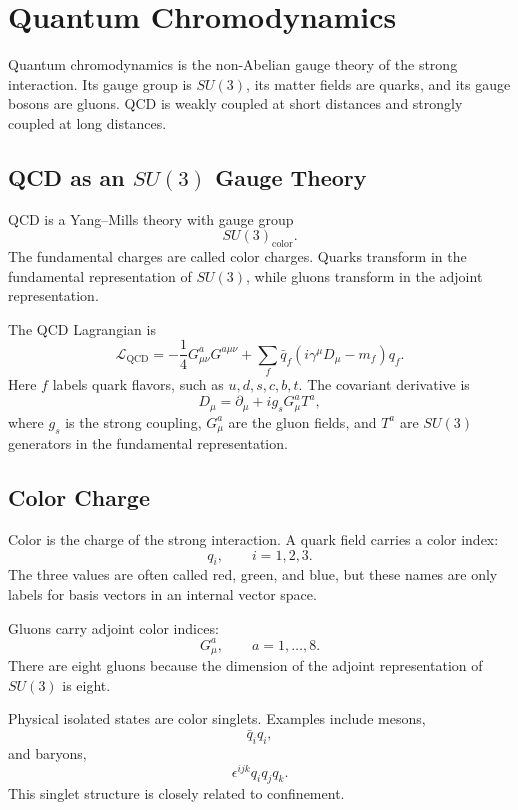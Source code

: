 \chapter{Quantum Chromodynamics}

\begin{remarkbox}
Quantum chromodynamics is the non-Abelian gauge theory of the strong
interaction. Its gauge group is \(SU(3)\), its matter fields are quarks, and its
gauge bosons are gluons. QCD is weakly coupled at short distances and strongly
coupled at long distances.
\end{remarkbox}

\section{QCD as an \texorpdfstring{\(SU(3)\)}{SU(3)} Gauge Theory}

QCD is a Yang--Mills theory with gauge group
\[
    SU(3)_{\mathrm{color}}.
\]
The fundamental charges are called color charges. Quarks transform in the
fundamental representation of \(SU(3)\), while gluons transform in the adjoint
representation.

The QCD Lagrangian is
\[
    \mathcal{L}_{\mathrm{QCD}}
    = -\frac{1}{4}G_{\mu\nu}^aG^{a\mu\nu}
      +\sum_f \bar q_f(i\gamma^\mu D_\mu-m_f)q_f.
\]
Here \(f\) labels quark flavors, such as \(u,d,s,c,b,t\). The covariant
derivative is
\[
    D_\mu=\partial_\mu+ig_s G_\mu^a T^a,
\]
where \(g_s\) is the strong coupling, \(G_\mu^a\) are the gluon fields, and
\(T^a\) are \(SU(3)\) generators in the fundamental representation.

\section{Color Charge}

Color is the charge of the strong interaction. A quark field carries a color
index:
\[
    q_i,
    \qquad
    i=1,2,3.
\]
The three values are often called red, green, and blue, but these names are only
labels for basis vectors in an internal vector space.

Gluons carry adjoint color indices:
\[
    G_\mu^a,
    \qquad
    a=1,\ldots,8.
\]
There are eight gluons because the dimension of the adjoint representation of
\(SU(3)\) is eight.

Physical isolated states are color singlets. Examples include mesons,
\[
    \bar q_i q_i,
\]
and baryons,
\[
    \epsilon^{ijk}q_i q_j q_k.
\]
This singlet structure is closely related to confinement.

